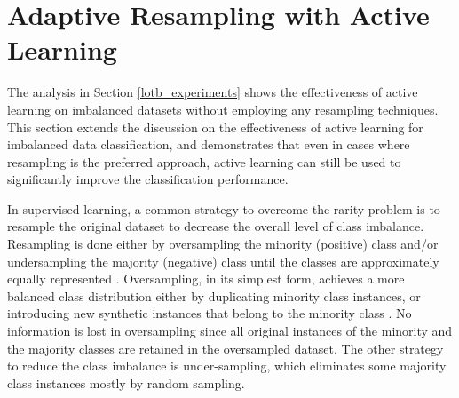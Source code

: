 


\section{Adaptive Resampling with Active Learning}
\label{virtual}
The analysis in Section \ref{lotb_experiments} shows the effectiveness of active learning on imbalanced datasets   without employing any resampling techniques. This section extends the discussion on the effectiveness of active learning for imbalanced data classification, and demonstrates that even in cases where resampling is the preferred approach, active learning can still be used to significantly improve the classification performance.

In supervised learning, a common strategy to overcome the rarity problem is to resample the original dataset to decrease the overall level of class imbalance. Resampling is done either by oversampling the minority (positive) class and/or undersampling the majority (negative) class until the classes are approximately equally represented \cite{Chawla_2002,Japkowicz_2000,Kubat_1997,Ling_1998}. Oversampling, in its simplest form, achieves a more balanced class distribution either by duplicating minority class instances, or introducing new synthetic instances that belong to the minority class \cite{Chawla_2002}. No information is lost in oversampling since all original instances of the minority and the majority classes are retained in the oversampled dataset. The other strategy to reduce the class imbalance is under-sampling, which eliminates some majority class instances mostly by random sampling.

